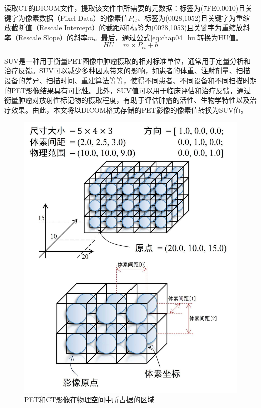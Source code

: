 读取CT的DICOM文件，提取该文件中所需要的元数据：标签为(7FE0,0010)且关键字为像素数据（Pixel Data）的像素值\(P_{ct}\)、标签为(0028,1052)且关键字为重缩放截断值（Rescale Intercept）的截距\(b\)和标签为(0028,1053)且关键字为重缩放斜率（Rescale Slope）的斜率\(m\)。最后，通过公式\ref{eq:chap04_hu}转换为HU值。
\begin{equation}
  HU = m \times P_{ct} + b
  \label{eq:chap04_hu}
\end{equation}

SUV是一种用于衡量PET图像中肿瘤摄取的相对标准单位，通常用于定量分析和治疗反馈。SUV可以减少多种因素带来的影响，如患者的体重、注射剂量、扫描设备的差异、扫描时间、重建算法等等，使得不同患者、不同设备和不同扫描时期的PET影像结果具有可比性。此外，SUV值可以用于临床评估和治疗反馈，通过衡量肿瘤对放射性标记物的摄取程度，有助于评估肿瘤的活性、生物学特性以及治疗效果。由此，本文将以DICOM格式存储的PET影像的像素值转换为SUV值。

\begin{figure}[b]
  \centering
  \includegraphics{figures/chap04_image.jpg}
  \caption{PET和CT影像在物理空间中所占据的区域}
  \label{fig:chap04_image}
\end{figure}

